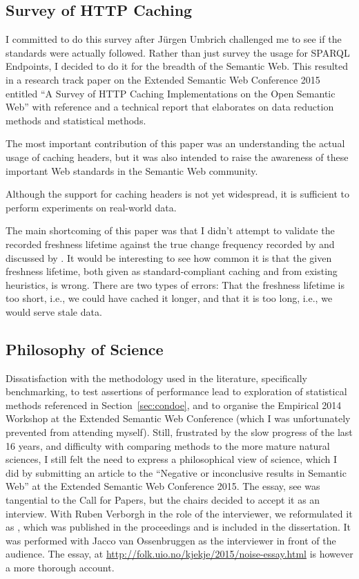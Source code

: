 \subsection{Survey of HTTP Caching}\label{sec:consanity}

I committed to do this survey after Jürgen Umbrich challenged me to see
if the standards were actually followed. Rather than just survey the
usage for SPARQL Endpoints, I decided to do it for the breadth of the
Semantic Web. This resulted in a research track paper on the Extended
Semantic Web Conference 2015 entitled ``A Survey of HTTP Caching
Implementations on the Open Semantic Web'' with reference
\cite{kjernsmo_survey_2015} and a technical report
\cite{kjernsmo_add_survey_2015} that elaborates on data reduction
methods and statistical methods.

The most important contribution of this paper was an understanding the
actual usage of caching headers, but it was also intended to raise the
awareness of these important Web standards in the Semantic Web community.

Although the support for caching headers is not yet widespread, it is
sufficient to perform experiments on real-world data.

The main shortcoming of this paper was that I didn't attempt to
validate the recorded freshness lifetime against the true change
frequency recorded by \cite{dyldo2} and discussed by
\cite{Dividino2015}. It would be interesting to see how common it is
that the given freshness lifetime, both given as standard-compliant
caching and from existing heuristics, is wrong. There are two types of
errors: That the freshness lifetime is too short, i.e., we could have
cached it longer, and that it is too long, i.e., we would serve stale
data.

\subsection{Philosophy of Science}\label{sec:conphil}

Dissatisfaction with the methodology used in the literature,
specifically benchmarking, to test assertions of performance lead to
exploration of statistical methods referenced in
Section~\ref{sec:condoe}, and to organise the Empirical 2014 Workshop
at the Extended Semantic Web Conference (which I was unfortunately
prevented from attending myself). Still, frustrated by the slow
progress of the last 16 years, and difficulty with comparing methods
to the more mature natural sciences, I still felt the need to express
a philosophical view of science, which I did by submitting an article
to the ``Negative or inconclusive results in Semantic Web'' at the
Extended Semantic Web Conference 2015. The essay, see
\cite{kjernsmo_noise_2015} was tangential to the Call for Papers, but
the chairs decided to accept it as an interview. With Ruben Verborgh
in the role of the interviewer, we reformulated it as
\cite{kjernsmo_noise_2015_interview}, which was published in the
proceedings and is included in the dissertation. It was performed with
Jacco van Ossenbruggen as the interviewer in front of the
audience. The essay, at
\url{http://folk.uio.no/kjekje/2015/noise-essay.html} is however a
more thorough account.

